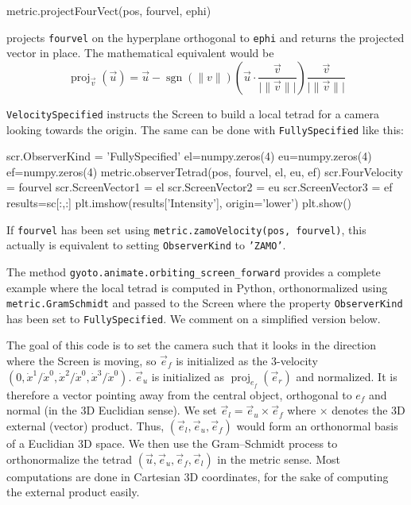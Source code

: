\documentclass[a4paper,12pt]{article}
\DeclareMathOperator{\sgn}{sgn}
\DeclareMathOperator{\proj}{proj}
\begin{document}
\begin{code}
  metric.projectFourVect(pos, fourvel, ephi)
\end{code}
projects \texttt{fourvel} on the hyperplane orthogonal to
\texttt{ephi} and returns the projected vector in place. The
mathematical equivalent would be
$$\proj_{\vec v}(\vec u) = \vec u - \sgn(\lVert v\rVert) (\vec u \cdot \frac{\vec v}{\lvert \lVert \vec v \rVert \rvert}) \frac{\vec v}{\lvert \lVert \vec v \rVert \rvert}$$

\texttt{VelocitySpecified} instructs the Screen to build a local
tetrad for a camera looking towards the origin. The same can be done
with \texttt{FullySpecified} like this:

\begin{code}
  scr.ObserverKind = 'FullySpecified'
  el=numpy.zeros(4)
  eu=numpy.zeros(4)
  ef=numpy.zeros(4)
  metric.observerTetrad(pos, fourvel, el, eu, ef)
  scr.FourVelocity  = fourvel
  scr.ScreenVector1 = el
  scr.ScreenVector2 = eu
  scr.ScreenVector3 = ef
  results=sc[:,:]
  plt.imshow(results['Intensity'], origin='lower')
  plt.show()
\end{code}

If \texttt{fourvel} has been set using
\texttt{metric.zamoVelocity(pos, fourvel)}, this actually is
equivalent to setting \texttt{ObserverKind} to \texttt{'ZAMO'}.

The method \texttt{gyoto.animate.orbiting\_screen\_forward} provides a
complete example where the local tetrad is computed in Python,
orthonormalized using \texttt{metric.GramSchmidt} and passed to the
Screen where the property \texttt{ObserverKind} has been set to
\texttt{FullySpecified}. We comment on a simplified version below.

The goal of this code is to set the camera such that it looks in the
direction where the Screen is moving, so $\vec e_f$ is initialized as
the 3-velocity $(0, \dot x^1 / \dot x^0, \dot x^2 / \dot x^0, \dot x^3
/ \dot x^0)$. $\vec e_u$ is initialized as $\proj_{e_f}(\vec e_r)$ and
normalized. It is therefore a vector pointing away from the central
object, orthogonal to $e_f$ and normal (in the 3D Euclidian sense). We
set $\vec e_l=\vec e_u \times \vec e_f$ where $\times$ denotes the 3D
external (vector) product. Thus, $(\vec e_l, \vec e_u, \vec e_f)$
would form an orthonormal basis of a Euclidian 3D space. We then use
the Gram--Schmidt process to orthonormalize the tetrad $(\vec u, \vec
e_u, \vec e_f, \vec e_l)$ in the metric sense. Most computations are
done in Cartesian 3D coordinates, for the sake of computing the
external product easily.
\end{document}
